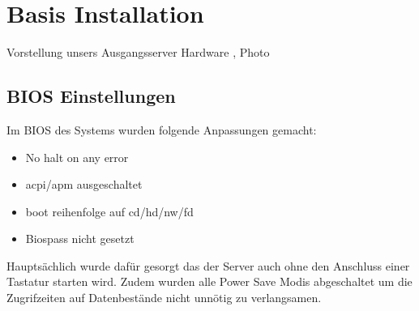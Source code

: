 \chapter{Basis Installation}  %
\label{Basis Installation}  %

Vorstellung unsers Ausgangsserver
Hardware , Photo 

\section{BIOS Einstellungen}
\label{section:BIOS Einstellungen}
Im BIOS des Systems wurden folgende Anpassungen gemacht:
\begin{itemize}
\item No halt on any error
\item acpi/apm ausgeschaltet
\item boot reihenfolge auf cd/hd/nw/fd
\item Biospass nicht gesetzt
\end{itemize}
Hauptsächlich wurde dafür gesorgt das der Server auch ohne den Anschluss einer Tastatur starten wird. Zudem wurden alle Power Save Modis abgeschaltet um die Zugrifzeiten auf Datenbestände nicht unnötig zu verlangsamen.
 
